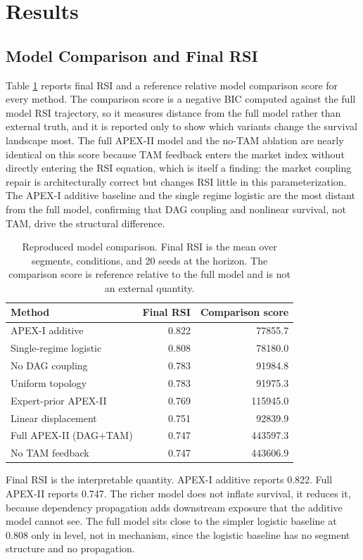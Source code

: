 \documentclass[10pt,conference]{IEEEtran}
\begin{document}
\section{Results}
\subsection{Model Comparison and Final RSI}
Table \ref{tab:comparison} reports final RSI and a reference relative model comparison score for every method. The comparison score is a negative BIC computed against the full model RSI trajectory, so it measures distance from the full model rather than external truth, and it is reported only to show which variants change the survival landscape most. The full APEX-II model and the no-TAM ablation are nearly identical on this score because TAM feedback enters the market index without directly entering the RSI equation, which is itself a finding: the market coupling repair is architecturally correct but changes RSI little in this parameterization. The APEX-I additive baseline and the single regime logistic are the most distant from the full model, confirming that DAG coupling and nonlinear survival, not TAM, drive the structural difference.

\begin{table}[t]
\caption{Reproduced model comparison. Final RSI is the mean over segments, conditions, and 20 seeds at the horizon. The comparison score is reference relative to the full model and is not an external quantity.}
\centering
\begin{tabular}{lrr}
\toprule
Method & Final RSI & Comparison score \\
\midrule
APEX-I additive & 0.822 & 77855.7 \\
Single-regime logistic & 0.808 & 78180.0 \\
No DAG coupling & 0.783 & 91984.8 \\
Uniform topology & 0.783 & 91975.3 \\
Expert-prior APEX-II & 0.769 & 115945.0 \\
Linear displacement & 0.751 & 92839.9 \\
Full APEX-II (DAG+TAM) & 0.747 & 443597.3 \\
No TAM feedback & 0.747 & 443606.9 \\
\bottomrule
\end{tabular}
\label{tab:comparison}
\end{table}

Final RSI is the interpretable quantity. APEX-I additive reports 0.822. Full APEX-II reports 0.747. The richer model does not inflate survival, it reduces it, because dependency propagation adds downstream exposure that the additive model cannot see. The full model sits close to the simpler logistic baseline at 0.808 only in level, not in mechanism, since the logistic baseline has no segment structure and no propagation.
\end{document}
